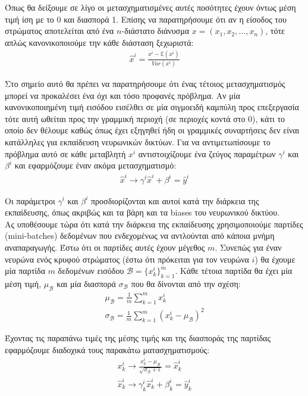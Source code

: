 \documentclass[11pt]{article} %
\numberwithin{equation}{subsection}
\begin{document}
Όπως θα δείξουμε σε λίγο οι μετασχηματισμένες αυτές ποσότητες έχουν όντως μέση τιμή ίση με το 0 και διασπορά 1. Επίσης να παρατηρήσουμε ότι αν η είσοδος του στρώματος αποτελείται από ένα $n$-διάστατο διάνυσμα $x = \left(x_1, x_2, \dots, x_n \right)$, τότε απλώς κανονικοποιούμε την κάθε διάσταση ξεχωριστά:
\begin{align*}
\hat{x}^i  = \frac{x^i - \mathbb{E}(x^i)}{Var(x^i)}
\end{align*}

Στο σημείο αυτό θα πρέπει να παρατηρήσουμε ότι ένας τέτοιος μετασχηματισμός μπορεί να προκαλέσει ένα όχι και τόσο προφανές πρόβλημα. Αν μία κανονικοποιημένη τιμή εισόδου εισέλθει σε μία σιγμοειδή καμπύλη προς επεξεργασία τότε αυτή ωθείται προς την γραμμική περιοχή (σε περιοχές κοντά στο 0), κάτι το οποίο δεν θέλουμε καθώς όπως έχει εξηγηθεί ήδη οι γραμμικές συναρτήσεις δεν είναι κατάλληλες για εκπαίδευση νευρωνικών δικτύων. Για να αντιμετωπίσουμε το πρόβλημα αυτό σε κάθε μεταβλητή $x^i$ αντιστοιχίζουμε ένα ζεύγος παραμέτρων $\gamma^i$ και $\beta^i$ και εφαρμόζουμε έναν ακόμα μετασχηματισμό:
\begin{align*}
\hat{x}^i \rightarrow \gamma^i \hat{x}^i + \beta^i = \hat{y}^i
\end{align*} 

Οι παράμετροι $\gamma^i$ και $\beta^i$ προσδιορίζονται και αυτοί κατά την διάρκεια της εκπαίδευσης, όπως ακριβώς και τα βάρη και τα biases του νευρωνικού δικτύου.\\

Ας υποθέσουμε τώρα ότι κατά την διάρκεια της εκπαίδευσης χρησιμοποιούμε παρτίδες (mini-batches) δεδομένων που ενδεχομένως να αντλούνται από κάποια μνήμη αναπαραγωγής. Έστω ότι οι παρτίδες αυτές έχουν μέγεθος $m$. Συνεπώς για έναν νευρώνα ενός κρυφού στρώματος (έστω ότι πρόκειται για τον νευρώνα $i$)  θα έχουμε μία παρτίδα $m$ δεδομένων εισόδου $ \mathcal{B} = \{x_k^i\}_{k=1}^m$. Κάθε τέτοια παρτίδα θα έχει μία μέση τιμή, $\mu_{\mathcal{B}}$ και μία διασπορά $\sigma_{\mathcal{B}}$ που θα δίνονται από την σχέση:
\begin{align*}
\mu_{\mathcal{B}} = \frac{1}{m} \sum_{k=1}^{m} x_k^i\\
\sigma_{\mathcal{B}} = \frac{1}{m} \sum_{k=1}^{m} (x_k^i -\mu_{\mathcal{B}} )^2
\end{align*}

Έχοντας τις παραπάνω τιμές της μέσης τιμής και της διασποράς της παρτίδας εφαρμόζουμε διαδοχικά τους παρακάτω ματασχηματισμούς:
\begin{align*}
x_k^i \rightarrow \frac{x_k^i - \mu_{\mathcal{B}}}{\sqrt{\sigma_{\mathcal{B}} + \epsilon}} = \hat{x}_k^i\\
\hat{x}_k^i \rightarrow \gamma_k^i \hat{x}_k^i + \beta_k^i = \hat{y}_k^i
\end{align*}
\end{document}

